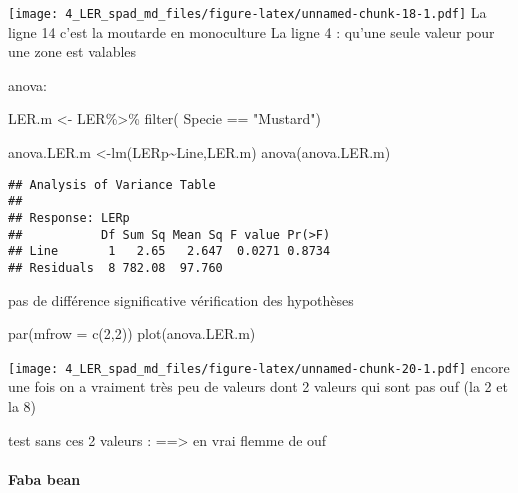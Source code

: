 \documentclass[
]{article}
\newenvironment{Shaded}{\begin{snugshade}}{\end{snugshade}}
\newcommand{\AttributeTok}[1]{\textcolor[rgb]{0.77,0.63,0.00}{#1}}
\newcommand{\DecValTok}[1]{\textcolor[rgb]{0.00,0.00,0.81}{#1}}
\newcommand{\FunctionTok}[1]{\textcolor[rgb]{0.00,0.00,0.00}{#1}}
\newcommand{\NormalTok}[1]{#1}
\newcommand{\OtherTok}[1]{\textcolor[rgb]{0.56,0.35,0.01}{#1}}
\newcommand{\SpecialCharTok}[1]{\textcolor[rgb]{0.00,0.00,0.00}{#1}}
\newcommand{\StringTok}[1]{\textcolor[rgb]{0.31,0.60,0.02}{#1}}
\begin{document}
\texttt{[image: 4\_LER\_spad\_md\_files/figure-latex/unnamed-chunk-18-1.pdf]}
La ligne 14 c'est la moutarde en monoculture La ligne 4 : qu'une seule
valeur pour une zone est valables

anova:

\begin{Shaded}
\begin{Highlighting}[]
\NormalTok{LER.m }\OtherTok{\textless{}{-}}\NormalTok{ LER}\SpecialCharTok{\%\textgreater{}\%}
  \FunctionTok{filter}\NormalTok{( Specie }\SpecialCharTok{==} \StringTok{"Mustard"}\NormalTok{)}

\NormalTok{anova.LER.m }\OtherTok{\textless{}{-}}\FunctionTok{lm}\NormalTok{(LERp}\SpecialCharTok{\textasciitilde{}}\NormalTok{Line,LER.m)}
\FunctionTok{anova}\NormalTok{(anova.LER.m)}
\end{Highlighting}
\end{Shaded}

\begin{verbatim}
## Analysis of Variance Table
## 
## Response: LERp
##           Df Sum Sq Mean Sq F value Pr(>F)
## Line       1   2.65   2.647  0.0271 0.8734
## Residuals  8 782.08  97.760
\end{verbatim}

pas de différence significative vérification des hypothèses

\begin{Shaded}
\begin{Highlighting}[]
\FunctionTok{par}\NormalTok{(}\AttributeTok{mfrow =} \FunctionTok{c}\NormalTok{(}\DecValTok{2}\NormalTok{,}\DecValTok{2}\NormalTok{))}
\FunctionTok{plot}\NormalTok{(anova.LER.m)}
\end{Highlighting}
\end{Shaded}

\texttt{[image: 4\_LER\_spad\_md\_files/figure-latex/unnamed-chunk-20-1.pdf]}
encore une fois on a vraiment très peu de valeurs dont 2 valeurs qui
sont pas ouf (la 2 et la 8)

test sans ces 2 valeurs : ==\textgreater{} en vrai flemme de ouf

\hypertarget{faba-bean}{%
\paragraph{Faba bean}\label{faba-bean}}
\end{document}
